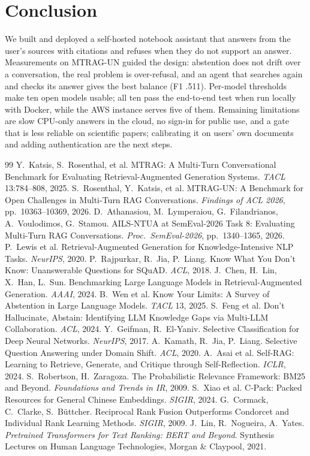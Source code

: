\documentclass[10pt]{article}
\begin{document}
\section{Conclusion}
We built and deployed a self-hosted notebook assistant that answers from the user's sources with citations and refuses when they do not support an answer. Measurements on MTRAG-UN guided the design: abstention does not drift over a conversation, the real problem is over-refusal, and an agent that searches again and checks its answer gives the best balance (F1 .511). Per-model thresholds make ten open models usable; all ten pass the end-to-end test when run locally with Docker, while the AWS instance serves five of them. Remaining limitations are slow CPU-only answers in the cloud, no sign-in for public use, and a gate that is less reliable on scientific papers; calibrating it on users' own documents and adding authentication are the next steps.

\clearpage
\begin{thebibliography}{99}\setlength{\itemsep}{1pt}\small
{} Y.~Katsis, S.~Rosenthal, et al. MTRAG: A Multi-Turn Conversational Benchmark for Evaluating Retrieval-Augmented Generation Systems. \emph{TACL} 13:784--808, 2025.
 S.~Rosenthal, Y.~Katsis, et al. MTRAG-UN: A Benchmark for Open Challenges in Multi-Turn RAG Conversations. \emph{Findings of ACL 2026}, pp.~10363--10369, 2026.
 D.~Athanasiou, M.~Lymperaiou, G.~Filandrianos, A.~Voulodimos, G.~Stamou. AILS-NTUA at SemEval-2026 Task 8: Evaluating Multi-Turn RAG Conversations. \emph{Proc.\ SemEval-2026}, pp.~1340--1365, 2026.
 P.~Lewis et al. Retrieval-Augmented Generation for Knowledge-Intensive NLP Tasks. \emph{NeurIPS}, 2020.
 P.~Rajpurkar, R.~Jia, P.~Liang. Know What You Don't Know: Unanswerable Questions for SQuAD. \emph{ACL}, 2018.
 J.~Chen, H.~Lin, X.~Han, L.~Sun. Benchmarking Large Language Models in Retrieval-Augmented Generation. \emph{AAAI}, 2024.
 B.~Wen et al. Know Your Limits: A Survey of Abstention in Large Language Models. \emph{TACL} 13, 2025.
 S.~Feng et al. Don't Hallucinate, Abstain: Identifying LLM Knowledge Gaps via Multi-LLM Collaboration. \emph{ACL}, 2024.
 Y.~Geifman, R.~El-Yaniv. Selective Classification for Deep Neural Networks. \emph{NeurIPS}, 2017.
 A.~Kamath, R.~Jia, P.~Liang. Selective Question Answering under Domain Shift. \emph{ACL}, 2020.
 A.~Asai et al. Self-RAG: Learning to Retrieve, Generate, and Critique through Self-Reflection. \emph{ICLR}, 2024.
 S.~Robertson, H.~Zaragoza. The Probabilistic Relevance Framework: BM25 and Beyond. \emph{Foundations and Trends in IR}, 2009.
 S.~Xiao et al. C-Pack: Packed Resources for General Chinese Embeddings. \emph{SIGIR}, 2024.
 G.~Cormack, C.~Clarke, S.~B\"uttcher. Reciprocal Rank Fusion Outperforms Condorcet and Individual Rank Learning Methods. \emph{SIGIR}, 2009.
 J.~Lin, R.~Nogueira, A.~Yates. \emph{Pretrained Transformers for Text Ranking: BERT and Beyond}. Synthesis Lectures on Human Language Technologies, Morgan \& Claypool, 2021.
\end{thebibliography}
\end{document}
